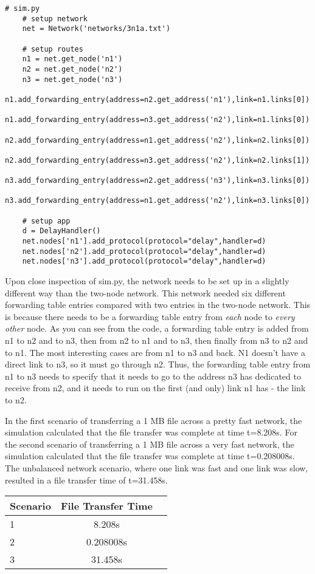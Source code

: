 \documentclass[11pt]{article}
\begin{document}
\begin{lstlisting}
# sim.py
    # setup network
    net = Network('networks/3n1a.txt')

    # setup routes
    n1 = net.get_node('n1')
    n2 = net.get_node('n2')
    n3 = net.get_node('n3')
    n1.add_forwarding_entry(address=n2.get_address('n1'),link=n1.links[0])
    n1.add_forwarding_entry(address=n3.get_address('n2'),link=n1.links[0])
    n2.add_forwarding_entry(address=n1.get_address('n2'),link=n2.links[0])
    n2.add_forwarding_entry(address=n3.get_address('n2'),link=n2.links[1])
    n3.add_forwarding_entry(address=n2.get_address('n3'),link=n3.links[0])
    n3.add_forwarding_entry(address=n1.get_address('n2'),link=n3.links[0])

    # setup app
    d = DelayHandler()
    net.nodes['n1'].add_protocol(protocol="delay",handler=d)
    net.nodes['n2'].add_protocol(protocol="delay",handler=d)
    net.nodes['n3'].add_protocol(protocol="delay",handler=d)
\end{lstlisting}

Upon close inspection of sim.py, the network needs to be set up in a slightly different way than the two-node network. This network needed six different forwarding table entries compared with two entries in the two-node network. This is because there needs to be a forwarding table entry from \emph{each} node to \emph{every other} node. As you can see from the code, a forwarding table entry is added from n1 to n2 and to n3, then from n2 to n1 and to n3, then finally from n3 to n2 and to n1. The most interesting cases are from n1 to n3 and back. N1 doesn't have a direct link to n3, so it must go through n2. Thus, the forwarding table entry from n1 to n3 needs to specify that it needs to go to the address n3 has dedicated to receive from n2, and it needs to run on the first (and only) link n1 has - the link to n2.

In the first scenario of transferring a 1 MB file across a pretty fast network, the simulation calculated that the file transfer was complete at time t=8.208s. For the second scenario of transferring a 1 MB file across a very fast network, the simulation calculated that the file transfer was complete at time t=0.208008s. The unbalanced network scenario, where one link was fast and one link was slow, resulted in a file transfer time of t=31.458s.

\vspace{0.5cm}
\begin{tabular}{lcc}
  \toprule
  Scenario & File Transfer Time\\
  \midrule
  1 & 8.208s \\
  2 & 0.208008s \\
  3 & 31.458s \\
  \bottomrule
\end{tabular}
\vspace{0.5cm}
\end{document}
